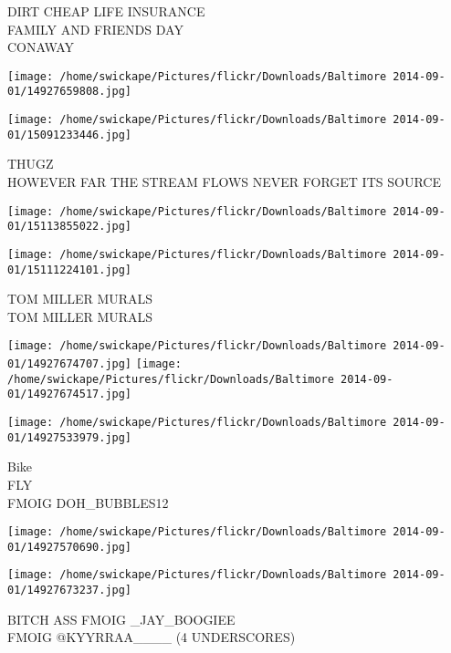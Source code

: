 \documentclass[10pt,letterpaper]{article}
\begin{document}
DIRT CHEAP LIFE INSURANCE\\
FAMILY AND FRIENDS DAY\\
CONAWAY\\
\pagebreak

\texttt{[image: /home/swickape/Pictures/flickr/Downloads/Baltimore 2014-09-01/14927659808.jpg]}

\vspace{0.25in}
\texttt{[image: /home/swickape/Pictures/flickr/Downloads/Baltimore 2014-09-01/15091233446.jpg]}

THUGZ\\
HOWEVER FAR THE STREAM FLOWS NEVER FORGET ITS SOURCE\\
\pagebreak

\texttt{[image: /home/swickape/Pictures/flickr/Downloads/Baltimore 2014-09-01/15113855022.jpg]}

\vspace{0.25in}
\texttt{[image: /home/swickape/Pictures/flickr/Downloads/Baltimore 2014-09-01/15111224101.jpg]}

TOM MILLER MURALS\\
TOM MILLER MURALS\\
\pagebreak

\texttt{[image: /home/swickape/Pictures/flickr/Downloads/Baltimore 2014-09-01/14927674707.jpg]}
\texttt{[image: /home/swickape/Pictures/flickr/Downloads/Baltimore 2014-09-01/14927674517.jpg]}

\vspace{0.25in}
\texttt{[image: /home/swickape/Pictures/flickr/Downloads/Baltimore 2014-09-01/14927533979.jpg]}

Bike\\
FLY\\
FMOIG DOH\_BUBBLES12\\
\pagebreak

\texttt{[image: /home/swickape/Pictures/flickr/Downloads/Baltimore 2014-09-01/14927570690.jpg]}

\vspace{0.25in}
\texttt{[image: /home/swickape/Pictures/flickr/Downloads/Baltimore 2014-09-01/14927673237.jpg]}

BITCH ASS FMOIG \_JAY\_BOOGIEE\\
FMOIG @KYYRRAA\_\_\_\_ (4 UNDERSCORES)\\
\pagebreak
\end{document}

